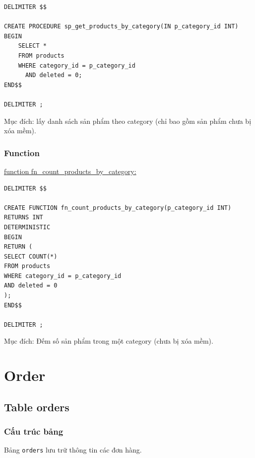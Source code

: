 \begin{verbatim}
DELIMITER $$

CREATE PROCEDURE sp_get_products_by_category(IN p_category_id INT)
BEGIN
    SELECT *
    FROM products
    WHERE category_id = p_category_id
      AND deleted = 0;
END$$

DELIMITER ;
\end{verbatim}

Mục đích: lấy danh sách sản phẩm theo category (chỉ bao gồm sản phẩm chưa bị xóa mềm).

\subsubsection{Function}

\underline{function fn\_count\_products\_by\_category:}

\begin{verbatim}
DELIMITER $$

CREATE FUNCTION fn_count_products_by_category(p_category_id INT)
RETURNS INT
DETERMINISTIC
BEGIN
RETURN (
SELECT COUNT(*)
FROM products
WHERE category_id = p_category_id
AND deleted = 0
);
END$$

DELIMITER ;
\end{verbatim}

Mục đích: Đếm số sản phẩm trong một category (chưa bị xóa mềm).

\section{Order} 

\subsection{Table orders}

\subsubsection{Cấu trúc bảng}

Bảng \texttt{orders} lưu trữ thông tin các đơn hàng.

